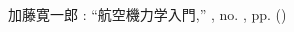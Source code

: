 
\begin{thebibliography}{99}


加藤寛一郎 : ``航空機力学入門,'' , no. , pp.  ()

\end{thebibliography}

\newpage
